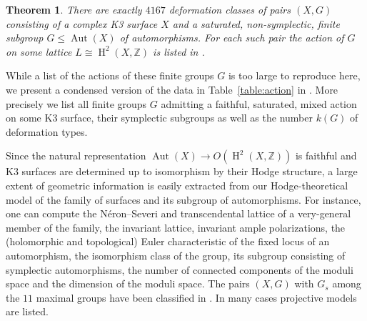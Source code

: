 \documentclass[a4paper]{amsart}
\theoremstyle{definition}
\theoremstyle{plain}
\newtheorem{theorem}[definition]{Theorem}
\DeclareMathOperator{\Aut}{Aut}
\DeclareMathOperator{\HH}{H}
\newcommand{\ZZ}{\mathbb{Z}}
\begin{document}
\begin{theorem}\label{mainthm}
There are exactly $4167$ deformation classes of pairs $(X,G)$ consisting of a complex K3 surface $X$ and a saturated, non-symplectic, finite subgroup $G \leq \Aut(X)$ of automorphisms.
For each such pair the action of $G$ on some lattice $L \cong \HH^2(X,\ZZ)$ is listed in \cite{K3Groups}.
\end{theorem}

While a list of the actions of these finite groups $G$ is too large to reproduce here,
we present a condensed
version of the data in Table~\ref{table:action} in .
More precisely we list all finite groups $G$ admitting a faithful, saturated, mixed action on some K3 surface, their symplectic subgroups as well as the number $k(G)$ of deformation types.

%
%
%
%
%
%
%
%
%
%
%
%
%
%
%
%
%
%
%
%
%
%
%
%
%
%
%
%
%
%
%
%
%
%
%
%
%
%
%
%
%
%
%
%
%
%
%
%
%
%
%
%
%
%
%
%
%
%
%
%
%
%
%
%
%
%
%
%
%
%
%
%
%
%
%
%
%
%
%
%
%
%
%
%
%
%
%
%
%
%
%
%
%
%
%
%
%
%
%
%
%
%
%
%
%
%
%
%
%
%
%
%
%
%


%
%
%
%
%
%
%
%
%
%
%
%
%
%
%
%
%
%
%
%
%
%
%
%
%
%
%
%
%
%
%
%
%
%
%
%
%
%
%
%
%
%
%
%
%
%
%
%
%
%
%
%
%
%
%
%
%
%
%
%
%
%
%
%
%
%
%
%
%
%
%
%
%
%
%
%
%
%
%
%
%
%
%
%
%
%
%
%
%
%
%
%
%
%
%
%
%
%
%
%
%
%
%
%
%
%
%
%
%
%
%
%
%
%
%
%
%
%
%
%
%
%
%
%
%
%
%
%
%
%
%
%
%
%
%
%
%
%
%
%
%
%
%
%
%
%
%
%
%
%
%
%
%
%
%
%
%
%
%
%
%
%
%
%
%
%
%
%
%
%
%
%
%
%
%
%
%
%
%
%
%
%
%
%
%
%
%
%
%
%
%
%
%
%
%
%
%
%
%
%
%
%
%
%
%
%
%
%
%
%
%
%
%
%
%
%
%
%
%
%
%
%
%
%
%
%
%
%
%
%
%
%
%
%
%
%
%
%
%
%
%
%
%
%
%
%
%
%
%
%
%
%
%
%
%
%
%
%
%
%
%
%
%
%
%
%
%
%
%
%
%
%
%
%
%
%
%
%
%
%
%
%
%
%
%
%
%
%
%
%
%
%
%
%
%
%
%
%
%
%
%
%
%
%
%
%
%
%
%
%
%
%
%
%
%
%
%
%
%
%
%
%
%
%
%
%
%
%
%
%
%
%
%
%
%
%
%
%
%
%
%
%
%
%
%
%
%
%
%
%
%
%
%
%
%
%
%
%
%
%
%
%
%
%
%
%
%
%
%
%
%
%
%
%
%
%
%
%
%
%
%
%
%
%
%
%
%
%
%
%
%
%
%
%
%
%
%
%
%
%
%
%
%
%
%
%
%
%
%
%
%
%
%
%
%
%
%
%
%
%
%
%
%
%
%
%
%

%
%
%
%
%
%
%
%
%

%
%
%
%
%
%
%
%
%
%
%
%
%
%
%
%
%
%
%
%
%
%
%
%
%
%
%
%
%
%
%
%
%
%
%
%
%
%
%
%
%
%
%
%
%
%
Since the natural representation
$\Aut(X) \to O(\HH^2(X,\ZZ))$ is faithful and K3 surfaces are determined up to isomorphism by their Hodge structure,
a large extent of geometric information is easily extracted from our Hodge-theoretical model of the family of surfaces and its subgroup of automorphisms.
For instance, one can compute the N\'eron--Severi and transcendental lattice of a very-general member of the family, the invariant lattice, invariant ample polarizations, the (holomorphic and topological) Euler characteristic of the fixed locus of an automorphism,
the isomorphism class of the group, its subgroup consisting of symplectic automorphisms, the number of connected components of the moduli space and the dimension of the moduli space.
The pairs $(X,G)$ with $G_s$ among the $11$ maximal groups have been classified in \cite{brandhorst-hashimoto2021}. In many cases projective models are listed.
\end{document}
